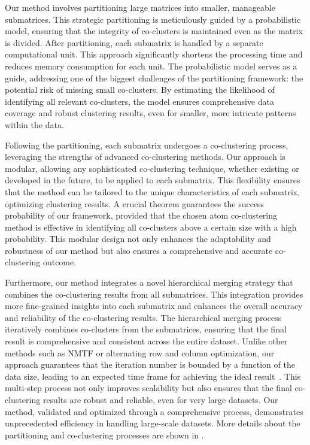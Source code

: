 \documentclass[journal]{IEEEtran}
\renewcommand{\cite}[1]{~\autocite{#1}}
\begin{document}
Our method involves partitioning large matrices into smaller, manageable submatrices. This strategic partitioning is meticulously guided by a probabilistic model, ensuring that the integrity of co-clusters is maintained even as the matrix is divided. After partitioning, each submatrix is handled by a separate computational unit. This approach significantly shortens the processing time and reduces memory consumption for each unit. The probabilistic model serves as a guide, addressing one of the biggest challenges of the partitioning framework: the potential risk of missing small co-clusters. By estimating the likelihood of identifying all relevant co-clusters, the model ensures comprehensive data coverage and robust clustering results, even for smaller, more intricate patterns within the data.

Following the partitioning, each submatrix undergoes a co-clustering process, leveraging the strengths of advanced co-clustering methods. Our approach is modular, allowing any sophisticated co-clustering technique, whether existing or developed in the future, to be applied to each submatrix. This flexibility ensures that the method can be tailored to the unique characteristics of each submatrix, optimizing clustering results. A crucial theorem guarantees the success probability of our framework, provided that the chosen atom co-clustering method is effective in identifying all co-clusters above a certain size with a high probability. This modular design not only enhances the adaptability and robustness of our method but also ensures a comprehensive and accurate co-clustering outcome.

Furthermore, our method integrates a novel hierarchical merging strategy that combines the co-clustering results from all submatrices. This integration provides more fine-grained insights into each submatrix and enhances the overall accuracy and reliability of the co-clustering results. The hierarchical merging process iteratively combines co-clusters from the submatrices, ensuring that the final result is comprehensive and consistent across the entire dataset. Unlike other methods such as NMTF or alternating row and column optimization, our approach guarantees that the iteration number is bounded by a function of the data size, leading to an expected time frame for achieving the ideal result\cite{wang2011FastNonnegativeMatrix}. This multi-step process not only improves scalability but also ensures that the final co-clustering results are robust and reliable, even for very large datasets. Our method, validated and optimized through a comprehensive process, demonstrates unprecedented efficiency in handling large-scale datasets.
More details about the partitioning and co-clustering processes are shown in .
\end{document}

